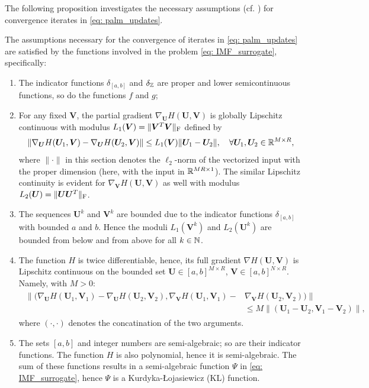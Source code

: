 The following proposition investigates the necessary assumptions (cf. \cite[Asm. 1 and Asm. 2]{bolte2014proximal}) for convergence iterates in \eqref{eq: palm_updates}.
\begin{prop}\label{prop: assumptions}
    The assumptions necessary for the convergence of iterates in \eqref{eq: palm_updates} are satisfied by the functions involved in the problem \eqref{eq: IMF_surrogate}, specifically:
    \begin{enumerate}
        \item The indicator functions $\delta_{[a,b]}$ and $\delta_\mathbb Z$ are proper and lower semicontinuous functions, so do the functions $f$ and $g$;
        \item For any fixed $\bm V$, the partial gradient $\nabla_{\bm U} H(\bm U, \bm V)$ is globally Lipschitz continuous with modulus $L_1(\bm V) = \|\bm V^T \bm V\|_{\rm F}$ defined by
        \begin{equation*}
            \|\nabla_{\bm U} H(\bm U_1, \bm V) - \nabla_{\bm U} H(\bm U_2, \bm V)\| \leq L_1(\bm V) \|\bm U_1 - \bm U_2\|, \quad \forall \bm U_1,\bm U_2 \in \mathbb{R}^{M\times R},
        \end{equation*}
        where $\|\cdot\|$ in this section denotes the $\ell_2$-norm of the vectorized input with the proper dimension (here, with the input in $\mathbb{R}^{MR\times 1}$).
        The similar Lipschitz continuity is evident for $\nabla_{\bm V} H(\bm U, \bm V)$ as well with modulus $L_2(\bm U) = \|\bm U \bm U^T\|_{\rm F}$.
        \item The sequences $\bm U^k$ and $\bm V^k$ are bounded due to the indicator functions $\delta_{[a,b]}$ with bounded $a$ and $b$. Hence the moduli $L_1(\bm V^k)$ and $L_2(\bm U^k)$ are bounded from below and from above for all $k\in\mathbb N$.
        \item The function $H$ is twice differentiable, hence, its full gradient $\nabla H(\bm U,\bm V)$ is Lipschitz continuous on the bounded set $\bm U \in [a,b]^{M\times R}$, $\bm V \in [a,b]^{N\times R}$. Namely, with $M > 0$:
        \begin{align}
            \begin{split}
                \|(\nabla_{\bm U} H(\bm U_1, \bm V_1) - \nabla_{\bm U} H(\bm U_2, \bm V_2), \nabla_{\bm V} H(\bm U_1, \bm V_1) - &\nabla_{\bm V} H(\bm U_2, \bm V_2))\| \\
                &\leq M \|(\bm U_1 - \bm U_2, \bm V_1 - \bm V_2)\|,
            \end{split}
        \end{align}
        where $(\cdot,\cdot)$ denotes the concatination of the two arguments.
        \item The sets $[a,b]$ and integer numbers are semi-algebraic; so are their indicator functions. The function $H$ is also polynomial, hence it is semi-algebraic. The sum of these functions results in a semi-algebraic function $\Psi$ in \eqref{eq: IMF_surrogate}, hence $\Psi$ is a Kurdyka-Łojasiewicz (KL) function.
    \end{enumerate}
\end{prop}
